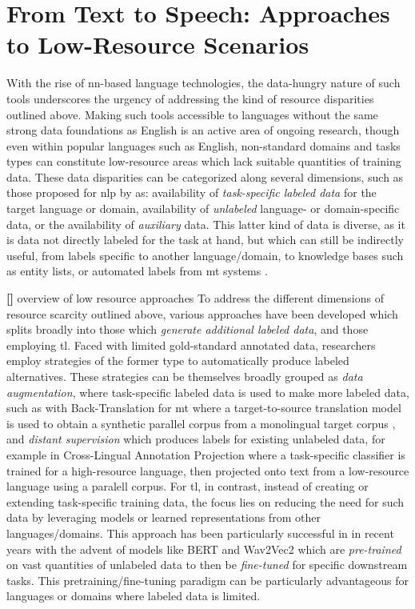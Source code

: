 \documentclass[thesis]{cluu}
\newcounter{paranum}
\newcommand{\numberedparagraph}{\par\refstepcounter{paranum}\textbf{[\theparanum] }}
\begin{document}
\section{From Text to Speech: Approaches to Low-Resource Scenarios}\label{lr_scenarios}
With the rise of \gls{nn}-based language technologies, the data-hungry nature of such tools underscores the urgency of addressing the kind of resource disparities outlined above. Making such tools accessible to languages without the same strong data foundations as English is an active area of ongoing research, though even within popular languages such as English, non-standard domains and tasks types can constitute low-resource areas which lack suitable quantities of training data. These data disparities can be categorized along several dimensions, such as those proposed for \gls{nlp} by \textcite{hedderichSurveyRecentApproaches2021} as: availability of \textit{task-specific labeled data} for the target language or domain, availability of \textit{unlabeled} language- or domain-specific data, or the availability of \textit{auxiliary} data. This latter kind of data is diverse, as it is data not directly labeled for the task at hand, but which can still be indirectly useful, from labels specific to another language/domain, to knowledge bases such as entity lists, or automated labels from \gls{mt} systems \parencite{hedderichSurveyRecentApproaches2021}.

\numberedparagraph{overview of low resource approaches}
To address the different dimensions of resource scarcity outlined above, various approaches have been developed which \textcite{hedderichSurveyRecentApproaches2021} splits broadly into those which \textit{generate additional labeled data}, and those employing \gls{tl}. Faced with limited gold-standard annotated data, researchers employ strategies of the former type to automatically produce labeled alternatives. These strategies can be themselves broadly grouped as \textit{data augmentation}, where task-specific labeled data is used to make more labeled data, such as with Back-Translation for \gls{mt} where a target-to-source translation model is used to obtain a synthetic parallel corpus from a monolingual target corpus \parencite{ranathungaNeuralMachineTranslation2021}, and \textit{distant supervision} which produces labels for existing unlabeled data, for example in Cross-Lingual Annotation Projection where a task-specific classifier is trained for a high-resource language, then projected onto text from a low-resource language using a paralell corpus. For \gls{tl}, in contrast, instead of creating or extending task-specific training data, the focus lies on reducing the need for such data by leveraging models or learned representations from other languages/domains. This approach has been particularly successful in in recent years with the advent of models like BERT \parencite{devlinBERTPretrainingDeep2019} and Wav2Vec2 \parencite{baevskiWav2vec20Framework2020a} which are \textit{pre-trained} on vast quantities of unlabeled data to then be \textit{fine-tuned} for specific downstream tasks. This pretraining/fine-tuning paradigm can be particularly advantageous for languages or domains where labeled data is limited.
\end{document}
